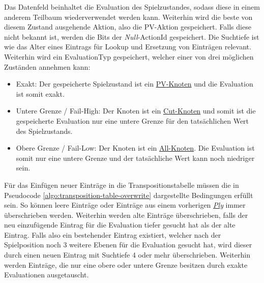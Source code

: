 Das Datenfeld beinhaltet die Evaluation des Spielzustandes, sodass diese in einem anderem Teilbaum wiederverwendet werden kann. Weiterhin wird die beste von diesem Zustand ausgehende Aktion, also die \ac{PV}-Aktion gespeichert. Falls diese nicht bekannt ist, werden die Bits der \emph{Null}-ActionId gespeichert. Die Suchtiefe ist wie das Alter eines Eintrags für Lookup und Ersetzung von Einträgen relevant. Weiterhin wird ein EvaluationTyp gespeichert, welcher einer von drei möglichen Zuständen annehmen kann:

\begin{itemize}
    \item Exakt: Der gespeicherte Spielzustand ist ein \hyperref[text:pv-node]{\acs{PV}-Knoten} und die Evaluation ist somit exakt.
    \item Untere Grenze / Fail-High: Der Knoten ist ein \hyperref[text:cut-node]{Cut-Knoten} und somit ist die gespeicherte Evaluation nur eine untere Grenze für den tatsächlichen Wert des Spielzustands.
    \item Obere Grenze / Fail-Low: Der Knoten ist ein \hyperref[text:all-node]{All-Knoten}. Die Evaluation ist somit nur eine untere Grenze und der tatsächliche Wert kann noch niedriger sein.
\end{itemize}

Für das Einfügen neuer Einträge in die Transpositionstabelle müssen die in Pseudocode \ref{algo:transposition-table-overwrite} dargestellte Bedingungen erfüllt sein. So können leere Einträge oder Einträge aus einem vorherigen \hyperref[text:ply]{\emph{Ply}} immer überschrieben werden. Weiterhin werden alte Einträge überschrieben, falls der neu einzufügende Eintrag für die Evaluation tiefer gesucht hat als der alte Eintrag. Falls also ein bestehender Eintrag existiert, welcher nach der Spielposition noch 3 weitere Ebenen für die Evaluation gesucht hat, wird dieser durch einen neuen Eintrag mit Suchtiefe 4 oder mehr überschrieben. Weiterhin werden Einträge, die nur eine obere oder untere Grenze besitzen durch exakte Evaluationen ausgetauscht.

\pagebreak


